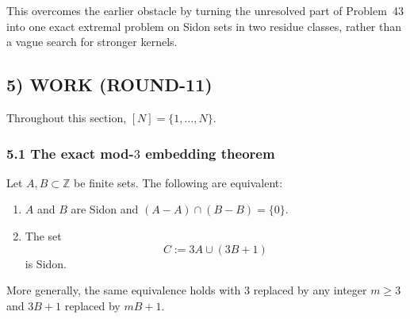 This overcomes the earlier obstacle by turning the unresolved part of Problem~43 into one exact extremal problem on Sidon sets in two residue classes, rather than a vague search for stronger kernels.

\subsection{5) WORK (ROUND-11)}

Throughout this section, $[N]=\{1,\dots,N\}$.

\subsubsection{5.1 The exact mod-$3$ embedding theorem}

\begin{theorem}
\label{thm:mod3embedding}
Let $A,B\subset \mathbb Z$ be finite sets.  The following are equivalent:
\begin{enumerate}
\item $A$ and $B$ are Sidon and $(A-A)\cap(B-B)=\{0\}$.
\item The set
\[
C:=3A\cup(3B+1)
\]
is Sidon.
\end{enumerate}
More generally, the same equivalence holds with $3$ replaced by any integer $m\ge 3$ and $3B+1$ replaced by $mB+1$.
\end{theorem}

